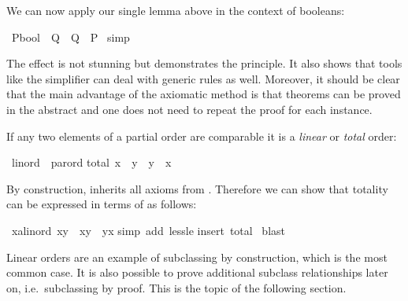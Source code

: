 \begin{isabellebody}
\begin{isamarkuptext}
We can now apply our single lemma above in the context of booleans:%
\end{isamarkuptext}%
\ {\isachardoublequote}{\isacharparenleft}P{\isacharcolon}{\isacharcolon}bool{\isacharparenright}\ {\isacharless}{\isacharless}\ Q\ {\isasymLongrightarrow}\ {\isasymnot}{\isacharparenleft}Q\ {\isacharless}{\isacharless}\ P{\isacharparenright}{\isachardoublequote}\isanewline
{}\ simp%
\begin{isamarkuptext}%
\noindent
The effect is not stunning but demonstrates the principle.  It also shows
that tools like the simplifier can deal with generic rules as well. Moreover,
it should be clear that the main advantage of the axiomatic method is that
theorems can be proved in the abstract and one does not need to repeat the
proof for each instance.%
\end{isamarkuptext}%
%
%
\begin{isamarkuptext}%
If any two elements of a partial order are comparable it is a
\emph{linear} or \emph{total} order:%
\end{isamarkuptext}%
\ linord\ {\isacharless}\ parord\isanewline
total{\isacharcolon}\ {\isachardoublequote}x\ {\isacharless}{\isacharless}{\isacharequal}\ y\ {\isasymor}\ y\ {\isacharless}{\isacharless}{\isacharequal}\ x{\isachardoublequote}%
\begin{isamarkuptext}%
\noindent
By construction,  inherits all axioms from .
Therefore we can show that totality can be expressed in terms of \isa{{\isacharless}{\isacharless}}
as follows:%
\end{isamarkuptext}%
\ {\isachardoublequote}{\isasymAnd}x{\isacharcolon}{\isacharcolon}{\isacharprime}a{\isacharcolon}{\isacharcolon}linord{\isachardot}\ x{\isacharless}{\isacharless}y\ {\isasymor}\ x{\isacharequal}y\ {\isasymor}\ y{\isacharless}{\isacharless}x{\isachardoublequote}\isanewline
{}simp\ add{\isacharcolon}\ less{\isacharunderscore}le{\isacharparenright}\isanewline
{}insert\ total{\isacharparenright}\isanewline
{}\ blast\isanewline
{}%
\begin{isamarkuptext}%
Linear orders are an example of subclassing by construction, which is the most
common case. It is also possible to prove additional subclass relationships
later on, i.e.\ subclassing by proof. This is the topic of the following
section.%
\end{isamarkuptext}%

\end{isabellebody}
